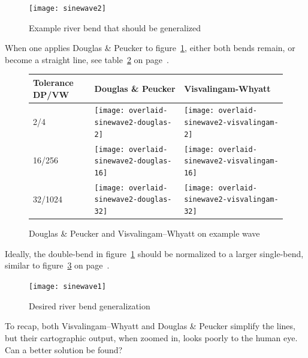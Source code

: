 \documentclass[a4paper]{article}
\newcommand{\DP}{Douglas \& Peucker}
\newcommand{\VW}{Visvalingam--Whyatt}
\begin{document}
\begin{figure}[h]
    \centering
    \texttt{[image: sinewave2]}
    \caption{Example river bend that should be generalized}
    \label{fig:sinewave2}
\end{figure}

When one applies {\DP} to figure~\ref{fig:sinewave2}, either both bends remain,
or become a straight line, see table~\ref{tab:comparison-sinewave2} on
page~\pageref{tab:comparison-sinewave2}.

\begin{figure}[h]
    \renewcommand{\tabularxcolumn}[1]{>{\center\small}m{#1}}
    \begin{tabularx}{\textwidth}{ p{1.5cm} | X | X | }
        Tolerance DP/VW                                                       &
        Douglas \& Peucker                                                    &
        Visvalingam-Whyatt                                                    \tabularnewline \hline

        2/4                                                                   &
        \texttt{[image: overlaid-sinewave2-douglas-2]}      &
        \texttt{[image: overlaid-sinewave2-visvalingam-2]}  \tabularnewline \hline

        16/256                                                                &
        \texttt{[image: overlaid-sinewave2-douglas-16]}     &
        \texttt{[image: overlaid-sinewave2-visvalingam-16]} \tabularnewline \hline

        32/1024                                                               &
        \texttt{[image: overlaid-sinewave2-douglas-32]}     &
        \texttt{[image: overlaid-sinewave2-visvalingam-32]} \tabularnewline \hline

    \end{tabularx}
    \caption{{\DP} and {\VW} on example wave}
    \label{tab:comparison-sinewave2}
\end{figure}

Ideally, the double-bend in figure~\ref{fig:sinewave2} should be normalized to
a larger single-bend, similar to figure~\ref{fig:sinewave1} on
page~\pageref{fig:sinewave2}.

\begin{figure}[h]
    \centering
    \texttt{[image: sinewave1]}
    \caption{Desired river bend generalization}
    \label{fig:sinewave1}
\end{figure}

To recap, both {\VW} and {\DP} simplify the lines, but their cartographic
output, when zoomed in, looks poorly to the human eye. Can a better solution be
found?
\end{document}
